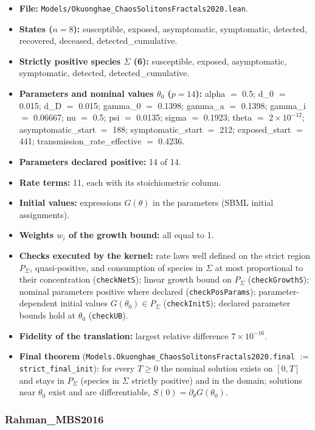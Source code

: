 \begin{itemize}\itemsep0pt\small
\item \textbf{File:} \texttt{Models/Okuonghae\_ChaosSolitonsFractals2020.lean}.
\item \textbf{States ($n=8$):} susceptible, exposed, asymptomatic, symptomatic, detected, recovered, deceased, detected\_cumulative.
\item \textbf{Strictly positive species $\Sigma$ (6):} susceptible, exposed, asymptomatic, symptomatic, detected, detected\_cumulative.
\item \textbf{Parameters and nominal values $\theta_0$ ($p=14$):} alpha $=$ 0.5; d\_0 $=$ 0.015; d\_D $=$ 0.015; gamma\_0 $=$ 0.1398; gamma\_a $=$ 0.1398; gamma\_i $=$ 0.06667; nu $=$ 0.5; psi $=$ 0.0135; sigma $=$ 0.1923; theta $=$ $2\times10^{-12}$; asymptomatic\_start $=$ 188; symptomatic\_start $=$ 212; exposed\_start $=$ 441; transmission\_rate\_effective $=$ 0.4236.
\item \textbf{Parameters declared positive:} 14 of 14.
\item \textbf{Rate terms:} 11, each with its stoichiometric column.
\item \textbf{Initial values:} expressions $G(\theta)$ in the parameters (SBML initial assignments).
\item \textbf{Weights $w_i$ of the growth bound:} all equal to 1.
\item \textbf{Checks executed by the kernel:} rate laws well defined on the strict region $P_\Sigma$, quasi-positive, and consumption of species in $\Sigma$ at most proportional to their concentration (\texttt{checkNetS}); linear growth bound on $P_\Sigma$ (\texttt{checkGrowthS}); nominal parameters positive where declared (\texttt{checkPosParams}); parameter-dependent initial values $G(\theta_0)\in P_\Sigma$ (\texttt{checkInitS}); declared parameter bounds hold at $\theta_0$ (\texttt{checkUB}).
\item \textbf{Fidelity of the translation:} largest relative difference $7\times10^{-16}$.
\item \textbf{Final theorem} (\texttt{Models.Okuonghae\_ChaosSolitonsFractals2020.final} $:=$ \texttt{strict\_final\_init}): for every $T\ge0$ the nominal solution exists on $[0,T]$ and stays in $P_\Sigma$ (species in $\Sigma$ strictly positive) and in the domain; solutions near $\theta_0$ exist and are differentiable, $S(0)=\partial_\theta G(\theta_0)$.
\end{itemize}

\subsubsection*{Rahman\_MBS2016}


